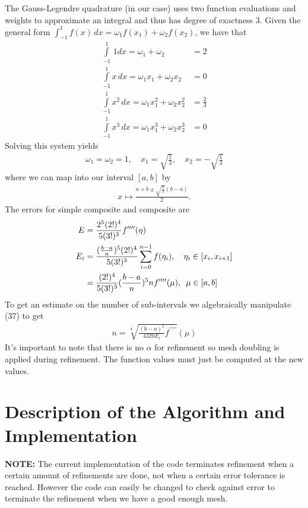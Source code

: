 \documentclass[12pt]{article}
\theoremstyle{remark}
\begin{document}
The Gauss-Legendre quadrature (in our case) uses two function evaluations and weights to approximate an integral and thus has degree of exactness 3. Given the general form $\int_{-1}^1 f(x) \, dx = \omega_1f(x_1) + \omega_2f(x_2)$, we have that
\begin{align}
\int\limits_{-1}^1 \, 1 dx = \omega_1 + \omega_2 & = 2 \\
\int\limits_{-1}^1 x \, dx = \omega_1x_1 + \omega_2x_2 & = 0 \\
\int\limits_{-1}^1 x^2 \, dx = \omega_1x_1^2 + \omega_2x_2^2 & = \frac{2}{3} \\
\int\limits_{-1}^1 x^3 \, dx = \omega_1x_1^3 + \omega_2x_2^3 & = 0
\end{align}
Solving this system yields
\begin{align}
	\omega_1 = \omega_2 = 1, \quad x_1 = \sqrt{\frac{1}{3}}, \quad x_2 = -\sqrt{\frac{1}{3}}
\end{align}
where we can map into our interval $[a,b]$ by 
\begin{align}
	x \mapsto \frac{a + b \pm \sqrt{\frac{1}{3}}(b-a)}{2}.
\end{align}
The errors for simple composite and composite are
\begin{align}
	E & = \frac{2^5(2!)^4}{5(3!)^3}f^{\prime\prime\prime\prime}(\eta) \\
	E_i & =  \frac{(\frac{b-a}{n})^5(2!)^4}{5(3!)^3}\sum\limits_{i=0}^{n-1}f(\eta_i), \quad \eta_i \in [x_i, x_{i+1}] \\
	& = \frac{(2!)^4}{5(3!)^3}(\frac{b-a}{n})^5nf^{\prime\prime\prime\prime}(\mu), \hskip .175cm \mu \in [a,b]
\end{align}
To get an estimate on the number of sub-intervals we algebraically manipulate (37) to get
\begin{align}
	n = \sqrt[4]{\frac{(b-a)^5}{4320E_i}f^{\prime\prime\prime\prime}}(\mu)
\end{align}
It's important to note that there is no $\alpha$ for refinement so mesh doubling is applied during refinement. The function values must just be computed at the new values.

\newpage

\section{Description of the Algorithm and Implementation}

\textbf{NOTE:} The current implementation of the code terminates refinement when a certain amount of refinements are done, not when a certain error tolerance is reached. However the code can easily be changed to check against error to terminate the refinement when we have a good enough mesh. \\
\end{document}
